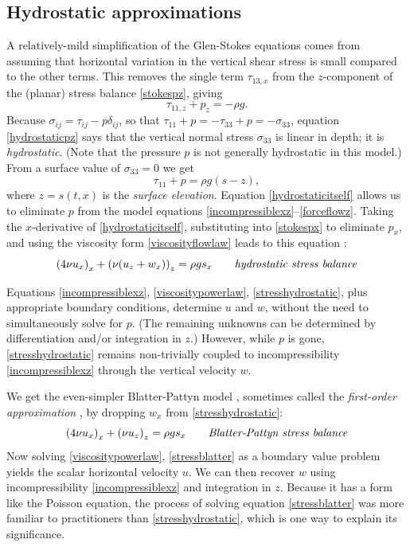 \documentclass[letterpaper,final,12pt,reqno]{amsart}
\begin{document}
\subsection*{Hydrostatic approximations}  A relatively-mild simplification of the Glen-Stokes equations comes from assuming that horizontal variation in the vertical shear stress is small compared to the other terms.  This removes the single term $\tau_{13,x}$ from the $z$-component of the (planar) stress balance \eqref{stokespz}, giving
\begin{equation}
\tau_{11,z} + p_z = - \rho g. \label{hydrostaticpz}
\end{equation}
Because $\sigma_{ij} = \tau_{ij} - p \delta_{ij}$, so that $\tau_{11}+p = - \tau_{33}+p = - \sigma_{33}$, equation \eqref{hydrostaticpz} says that the vertical normal stress $\sigma_{33}$ is linear in depth; it is \emph{hydrostatic}.  (Note that the pressure $p$ is not generally hydrostatic in this model.)  From a surface value of $\sigma_{33}=0$ we get
\begin{equation}
\tau_{11}+p = \rho g (s-z), \label{hydrostaticitself}
\end{equation}
where $z=s(t,x)$ is the \emph{surface elevation}.  Equation \eqref{hydrostaticitself} allows us to eliminate $p$ from the model equations \eqref{incompressiblexz}--\eqref{forceflowz}.  Taking the $x$-derivative of \eqref{hydrostaticitself}, substituting into \eqref{stokespx} to eliminate $p_x$, and using the viscosity form \eqref{viscosityflowlaw} leads to this equation \cite{GreveBlatter2009}:
\begin{equation}
\left(4 \nu u_x\right)_x + \left(\nu (u_z+w_x)\right)_z = \rho g s_x \qquad\text{\emph{hydrostatic stress balance}} \label{stresshydrostatic}
\end{equation}

Equations \eqref{incompressiblexz}, \eqref{viscositypowerlaw}, \eqref{stresshydrostatic}, plus appropriate boundary conditions, determine $u$ and $w$, without the need to simultaneously solve for $p$.  (The remaining unknowns can be determined by differentiation and/or integration in $z$.)  However, while $p$ is gone, \eqref{stresshydrostatic} remains non-trivially coupled to incompressibility \eqref{incompressiblexz} through the vertical velocity $w$.

We get the even-simpler Blatter-Pattyn model \cite{Pattyn2003}, sometimes called the \emph{first-order approximation} \cite{GreveBlatter2009}, by dropping $w_x$ from \eqref{stresshydrostatic}:
\begin{equation}
\left(4 \nu u_x\right)_x + \left(\nu u_z\right)_z = \rho g s_x \qquad\text{\emph{Blatter-Pattyn stress balance}} \label{stressblatter}
\end{equation}
Now solving \eqref{viscositypowerlaw}, \eqref{stressblatter} as a boundary value problem yields the scalar horizontal velocity $u$.  We can then recover $w$ using incompressibility \eqref{incompressiblexz} and integration in $z$.  Because it has a form like the Poisson equation, the process of solving equation \eqref{stressblatter} was more familiar to practitioners than \eqref{stresshydrostatic}, which is one way to explain its significance.
\end{document}
